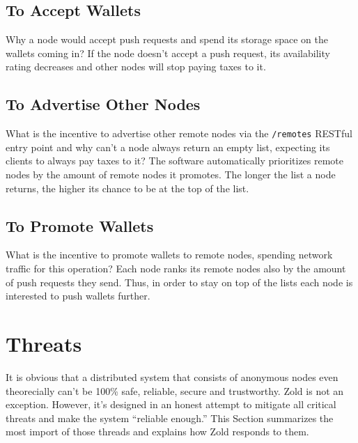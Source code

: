 \documentclass[11pt,oneside]{article}
\newcommand\dd[1]{\colorbox{gray!30}{\texttt{#1}}}
\begin{document}
\subsection{To Accept Wallets}

Why a node would accept push requests and spend its storage space
on the wallets coming in? If the node doesn't accept a push request,
its availability rating decreases and other nodes will stop paying
taxes to it.

\subsection{To Advertise Other Nodes}

What is the incentive to advertise other remote nodes via the \dd{/remotes} RESTful
entry point and why can't a node always return an empty list, expecting its clients
to always pay taxes to it? The software automatically prioritizes remote
nodes by the amount of remote nodes it promotes. The longer the list a node
returns, the higher its chance to be at the top of the list.

\subsection{To Promote Wallets}

What is the incentive to promote wallets to remote nodes, spending network
traffic for this operation? Each node ranks its remote nodes also by the
amount of push requests they send. Thus, in order to stay on top of the lists
each node is interested to push wallets further.


\section{Threats}

It is obvious that a distributed system that consists of anonymous nodes
even theorecially can't be 100\% safe, reliable, secure and trustworthy.
Zold is not an exception. However, it's designed in an honest attempt
to mitigate all critical threats and make the system ``reliable enough.''
This Section summarizes the most import of those threads and explains
how Zold responds to them.
\end{document}
